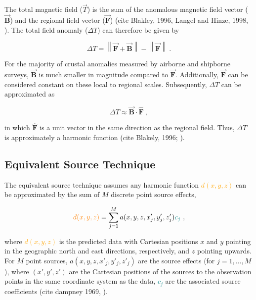 \noindent
The total magnetic field ($\vec{T}$) is the sum of the anomalous magnetic field vector ($\vec{\mathbf{B}}$) and the regional field vector ($\vec{\mathbf{F}}$) (cite Blakley, 1996, Langel and Hinze, 1998, \citep{OliveiraJr2015}). The total field anomaly ($\Delta T$) can therefore be given by

\begin{equation}
    \Delta T = \left\lVert \vec{\mathbf{F}} + \vec{\mathbf{B}} \right\rVert - \left\lVert \vec{\mathbf{F}} \right\rVert
    \ .
\end{equation}

For the majority of crustal anomalies measured by airborne and shipborne surveys, $\vec{\mathbf{B}}$ is much smaller in magnitude compared to $\vec{\mathbf{F}}$. Additionally, $\vec{\mathbf{F}}$ can be considered constant on these local to regional scales. Subsequently, $\Delta T$ can be approximated as

\begin{equation}
\label{'eq:tfa dot product'}
    \Delta T\approx  \vec{\mathbf{B}} \cdot \hat{\mathbf{F}}
    \ ,
\end{equation}

\noindent
in which $\hat{\mathbf{F}}$ is a unit vector in the same direction as the regional field. Thus, $\Delta T$ is approximately a harmonic function (cite Blakely, 1996; \citep{OliveiraJr2015}).

\subsection{Equivalent Source Technique}

The equivalent source technique assumes any harmonic function \textcolor{orange}{$d(x, y, z)$} can be approximated by the sum of $M$ discrete point source effects,

\begin{equation}
\label{'eq:eqs technique'}
\textcolor{orange}{d (x, y, z)} = \sum_{j=1}^{M} a(x, y, z, x'_j, y'_j , z'_j) \textcolor{teal}{c_j}
\ ,
\end{equation}

\noindent
where \textcolor{orange}{$d (x, y, z)$} is the predicted data with Cartesian positions $x$ and $y$ pointing in the geographic north and east directions, respectively, and $z$ pointing upwards. For $M$ point sources, $a(x, y, z, x'_j, y'_j , z'_j)$ are the source effects (for $j = 1, ..., M$), where $(x', y', z')$ are the Cartesian positions of the sources to the observation points in the same coordinate system as the data, \textcolor{teal}{$c_j$} are the associated source coefficients (cite dampney 1969, \cite{Cordell1992}).

